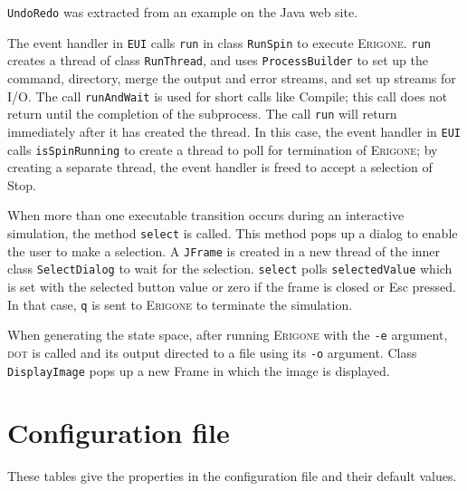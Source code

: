 \documentclass[11pt]{article}
\newcommand{\eri}{\textsc{Erigone}}
\newcommand{\p}[1]{\texttt{#1}}
\newcommand{\bu}[1]{\textsf{#1}}
\begin{document}
\p{UndoRedo} was extracted from an example on the Java web site.

The event handler in \p{EUI} calls \p{run} in class \p{RunSpin} to
execute \eri{}. \p{run} creates a thread of class \p{RunThread}, and
uses \p{ProcessBuilder} to set up the command, directory, merge the
output and error streams, and set up streams for I/O. The call
\p{runAndWait} is used for short calls like \bu{Compile}; this call does
not return until the completion of the subprocess. The call \p{run} will
return immediately after it has created the thread. In this case, the
event handler in \p{EUI} calls \p{isSpinRunning} to create a thread to
poll for termination of \eri{}; by creating a separate thread, the event
handler is freed to accept a selection of \bu{Stop}.

When more than one executable transition occurs during an interactive
simulation, the method \p{select} is called. This method pops up a
dialog to enable the user to make a selection. A \p{JFrame} is created
in a new thread of the inner class \p{SelectDialog} to wait for the
selection. \p{select} polls \p{selectedValue} which is set with the
selected button value or zero if the frame is closed or \bu{Esc}
pressed. In that case, \p{q} is sent to \eri{} to terminate the
simulation.

When generating the state space, after running \eri{} with the \p{-e}
argument, \textsc{dot} is called and its output directed to a file using
its \p{-o} argument. Class \p{DisplayImage} pops up a new Frame in which
the image is displayed.


\appendix

\section{Configuration file}\label{a.cfg}

These tables give the properties in the configuration file and their
default values.
\end{document}
